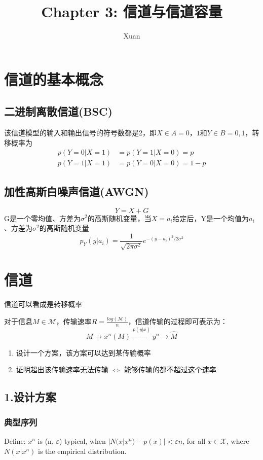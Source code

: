 \documentclass[a4paper, 12pt]{article}
\title{Chapter 3: 信道与信道容量}
\author{Xuan}
\begin{document}
    \maketitle
    \section{信道的基本概念}
    \subsection{二进制离散信道(BSC)}
    该信道模型的输入和输出信号的符号数都是2，即$X\in A={0，1}$和$Y\in B={0, 1}$，转移概率为
    \begin{equation}
        \begin{aligned}
            p(Y=0|X=1)&=p(Y=1|X=0)=p\\
            p(Y=1|X=1)&=p(Y=0|X=0)=1-p
        \end{aligned}
    \end{equation}
    \subsection{加性高斯白噪声信道(AWGN)}
    \[Y=X+G\]
    G是一个零均值、方差为$\sigma^2$的高斯随机变量，当$X=a_i$给定后，Y是一个均值为$a_i$、方差为$\sigma^2$的高斯随机变量
    \[p_Y(y|a_i)=\frac{1}{\sqrt{2\pi\sigma^2}}e^{-(y-a_i)^2/2\sigma^2}\]
    \section{信道}
    信道可以看成是转移概率

    对于信息$M\in\mathcal{M}$，传输速率$R=\frac{log(\mathcal{M})}{n}$，信道传输的过程即可表示为：
    \[M\rightarrow x^n(M)\xrightarrow{p(y|x)}y^n \rightarrow \hat{M}\]
    
    \begin{enumerate}
        \item 设计一个方案，该方案可以达到某传输概率
        \item 证明超出该传输速率无法传输 $\iff$ 能够传输的都不超过这个速率
    \end{enumerate}
    \subsection{1.设计方案}
    \subsubsection{典型序列}
    Define: $x^n$ is (n, $\varepsilon$) typical, when $|N(x|x^n)-p(x)|<\varepsilon n$, for all
    $x\in \mathcal{X}$, where $N(x|x^n)$ is the empirical distribution.
\end{document}
